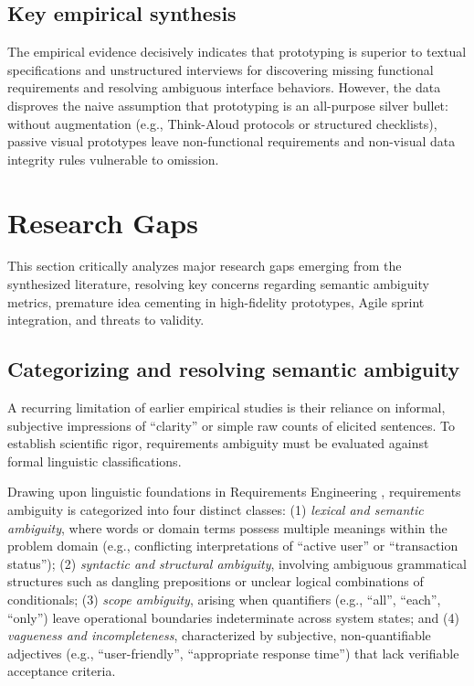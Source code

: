\documentclass[conference]{IEEEtran}
\begin{document}
\subsection{Key empirical synthesis}
The empirical evidence decisively indicates that prototyping is superior to textual specifications and unstructured interviews for discovering missing functional requirements and resolving ambiguous interface behaviors. However, the data disproves the naive assumption that prototyping is an all-purpose silver bullet: without augmentation (e.g., Think-Aloud protocols or structured checklists), passive visual prototypes leave non-functional requirements and non-visual data integrity rules vulnerable to omission.

\section{Research Gaps}
\label{sec:gaps}

This section critically analyzes major research gaps emerging from the synthesized literature, resolving key concerns regarding semantic ambiguity metrics, premature idea cementing in high-fidelity prototypes, Agile sprint integration, and threats to validity.

\subsection{Categorizing and resolving semantic ambiguity}
A recurring limitation of earlier empirical studies is their reliance on informal, subjective impressions of ``clarity'' or simple raw counts of elicited sentences. To establish scientific rigor, requirements ambiguity must be evaluated against formal linguistic classifications.

Drawing upon linguistic foundations in Requirements Engineering \cite{cascon2025ambiguity}, requirements ambiguity is categorized into four distinct classes: (1) \textit{lexical and semantic ambiguity}, where words or domain terms possess multiple meanings within the problem domain (e.g., conflicting interpretations of ``active user'' or ``transaction status''); (2) \textit{syntactic and structural ambiguity}, involving ambiguous grammatical structures such as dangling prepositions or unclear logical combinations of conditionals; (3) \textit{scope ambiguity}, arising when quantifiers (e.g., ``all'', ``each'', ``only'') leave operational boundaries indeterminate across system states; and (4) \textit{vagueness and incompleteness}, characterized by subjective, non-quantifiable adjectives (e.g., ``user-friendly'', ``appropriate response time'') that lack verifiable acceptance criteria.
\end{document}
